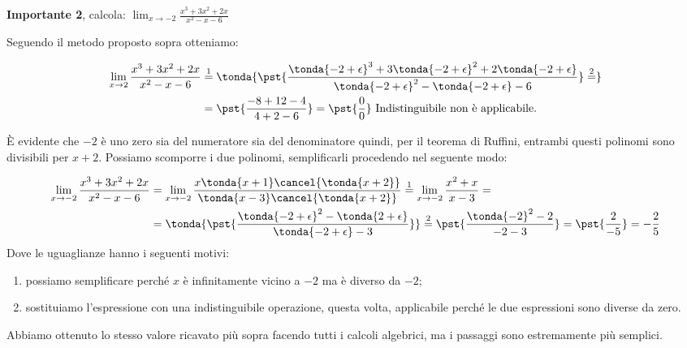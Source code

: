 \begin{esempio}
\textbf{Importante 2}, calcola: \quad 
  \(\displaystyle \lim_{x \rightarrow -2} \frac{x^3+3x^2+2x}{x^2-x-6}\)
 
Seguendo il metodo proposto sopra otteniamo:

\begin{align*}
\lim_{x \rightarrow 2} \frac{x^3+3x^2+2x}{x^2-x-6} & \stackrel{1}{=} 
\tonda{\pst{\frac
  {\tonda{-2+\epsilon}^3+3\tonda{-2+\epsilon}^2+2\tonda{-2+\epsilon}}
  {\tonda{-2+\epsilon}^2-\tonda{-2+\epsilon}-6}} \stackrel{2}{=}}\\ 
  &=\pst{\frac{-8+12-4}{4+2-6}} = \pst{\frac{0}{0}} 
  \text{ Indistinguibile non è applicabile.}
\end{align*}

È evidente che \(-2\) è uno zero sia del numeratore sia del denominatore 
quindi, per il teorema di Ruffini, entrambi questi polinomi sono divisibili 
per \(x+2\).
Possiamo scomporre i due polinomi, semplificarli procedendo nel seguente 
modo:

\begin{align*}
\lim_{x \rightarrow -2} \frac{x^3+3x^2+2x}{x^2-x-6} &=
\lim_{x \rightarrow -2} \frac{x \tonda{x+1} \cancel{\tonda{x+2}}}
          {\tonda{x-3} \cancel{\tonda{x+2}}} \stackrel{1}{=}
\lim_{x \rightarrow -2} \frac{x^2+x}{x-3}=\\
&=\tonda{\pst{\frac{\tonda{-2+\epsilon}^2-\tonda{2+\epsilon}}
                   {\tonda{-2+\epsilon}-3}}}\stackrel{2}{=}
\pst{\frac{\tonda{-2}^2-2}{-2-3}}=
\pst{\frac{2}{-5}} = -\frac{2}{5}
\end{align*}
Dove le uguaglianze hanno i seguenti motivi:
\begin{enumerate} [nosep]
 \item possiamo semplificare perché \(x\) è infinitamente vicino a \(-2\) ma è 
diverso da \(-2\);
 \item sostituiamo l'espressione con una indistinguibile operazione, questa 
volta, applicabile perché le due espressioni sono diverse da zero.
\end{enumerate}
\end{esempio}

\begin{osservazione}
Abbiamo ottenuto lo stesso valore ricavato più sopra facendo tutti i 
calcoli algebrici, ma i passaggi sono estremamente più semplici.
\end{osservazione}



